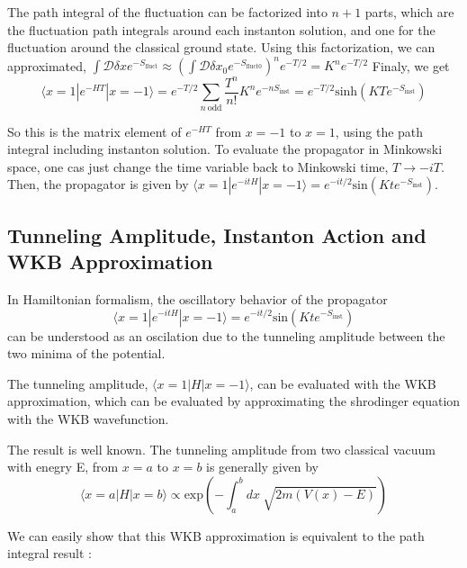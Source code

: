 \documentclass{article}
\begin{document}
The path integral of the fluctuation can be factorized into $n+1$ parts, which are the fluctuation path integrals around each instanton solution, and one for the fluctuation around the classical ground state.
Using this factorization, we can approximated, $\int \mathcal{D}\delta x e^{-S_{\text{fluct}}} \approx \left( \int \mathcal{D}\delta x_0 e^{-S_{\text{fluct}0}} \right)^n e^{-T/2}=K^n e^{-T/2}$
Finaly, we get
\begin{equation}
    \langle x = 1 | e^{-HT} | x = -1 \rangle = e^{-T/2} \sum_{n \ \text{odd}} \frac{T^n}{n!} K^n e^{-nS_{\text{inst}}}= e^{-T/2}  \text{sinh}(KT e^{-S_{\text{inst}}})
\end{equation}

So this is the matrix element of $e^{-HT}$ from $x = -1$ to $x = 1$, using the path integral including instanton solution. 
To evaluate the propagator in Minkowski space, one cas just change the time variable back to Minkowski time, $T \rightarrow -iT$.
Then, the propagator is given by $\langle x = 1 | e^{-itH} | x = -1 \rangle = e^{-it/2}  \text{sin}(Kt e^{-S_{\text{inst}}})$.

\subsection{Tunneling Amplitude, Instanton Action and WKB Approximation}

In Hamiltonian formalism, the oscillatory behavior of the propagator
\begin{equation}
    \langle x = 1 | e^{-itH} | x = -1 \rangle = e^{-it/2}  \text{sin}(Kt e^{-S_{\text{inst}}})
\end{equation}
can be understood as an oscilation due to the tunneling amplitude between the two minima of the potential.


The tunneling amplitude, $\langle x=1 | H | x=-1 \rangle $, can be evaluated with the WKB approximation, which can be evaluated by approximating the shrodinger equation with the WKB wavefunction.

The result is well known. The tunneling amplitude from two classical vacuum with enegry E, from $x = a$ to $x = b$ is generally given by
\begin{equation}
    \langle x = a | H | x = b \rangle \propto \text{exp}\left( -\int_a^b  dx \ \sqrt{2m(V(x)-E)} \right)
\end{equation}

We can easily show that this WKB approximation is equivalent to the path integral result :
    
\end{document}
